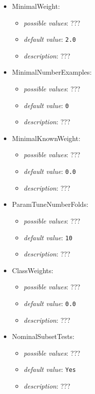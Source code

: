 \documentclass{article}
\begin{document}
\begin{itemize}
    \item MinimalWeight:
           \begin{itemize}
                \item \emph{possible values}: ???
                \item \emph{default value}: \texttt{2.0}
                \item \emph{description}: ???
           \end{itemize}
    \item MinimalNumberExamples:
           \begin{itemize}
                \item \emph{possible values}: ???
                \item \emph{default value}: \texttt{0}
                \item \emph{description}: ???
           \end{itemize}
    \item MinimalKnownWeight:
           \begin{itemize}
                \item \emph{possible values}: ???
                \item \emph{default value}: \texttt{0.0}
                \item \emph{description}: ???
           \end{itemize}
    \item ParamTuneNumberFolds:
           \begin{itemize}
                \item \emph{possible values}: ???
                \item \emph{default value}: \texttt{10}
                \item \emph{description}: ???
           \end{itemize}
    \item ClassWeights:
           \begin{itemize}
                \item \emph{possible values}: ???
                \item \emph{default value}: \texttt{0.0}
                \item \emph{description}: ???
           \end{itemize}
    \item NominalSubsetTests:
           \begin{itemize}
                \item \emph{possible values}: ???
                \item \emph{default value}: \texttt{Yes}
                \item \emph{description}: ???
           \end{itemize}
\end{itemize}
\end{document}
